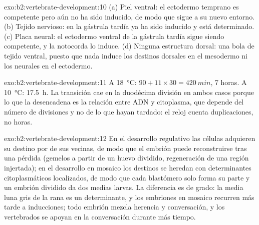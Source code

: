 \begin{solution}{exo:b2:vertebrate-development:10}
(a) Piel ventral: el ectodermo temprano es competente pero aún no ha sido
inducido, de modo que sigue a su nuevo entorno. (b) Tejido nervioso: en la
gástrula tardía ya ha sido inducido y está determinado. (c) Placa neural:
el ectodermo ventral de la gástrula tardía sigue siendo competente, y la
notocorda lo induce. (d) Ninguna estructura dorsal: una bola de tejido
ventral, puesto que nada induce los destinos dorsales en el mesodermo ni
los neurales en el ectodermo.
\end{solution}

\begin{solution}{exo:b2:vertebrate-development:11}
A \qty{18}{\celsius}: $90 + 11\times 30 = \qty{420}{min}$, 7 horas.
A \qty{10}{\celsius}: \qty{17.5}{h}. La transición cae en la duodécima
división en ambos casos porque lo que la desencadena es la relación entre
ADN y citoplasma, que depende del número de divisiones y no de lo que
hayan tardado: el reloj cuenta duplicaciones, no horas.
\end{solution}

\begin{solution}{exo:b2:vertebrate-development:12}
En el desarrollo regulativo las células adquieren su destino por
 de sus vecinas, de modo que el embrión puede reconstruirse tras
una pérdida (gemelos a partir de un huevo dividido, regeneración de una
región injertada); en el desarrollo en mosaico los destinos se heredan con
determinantes citoplasmáticos localizados, de modo que cada blastómero
solo forma su parte y un embrión dividido da dos medias larvas. La
diferencia es de grado: la media luna gris de la rana es un determinante,
y los embriones en mosaico recurren más tarde a inducciones; todo embrión
mezcla herencia y conversación, y los vertebrados se apoyan en la
conversación durante más tiempo.
\end{solution}


